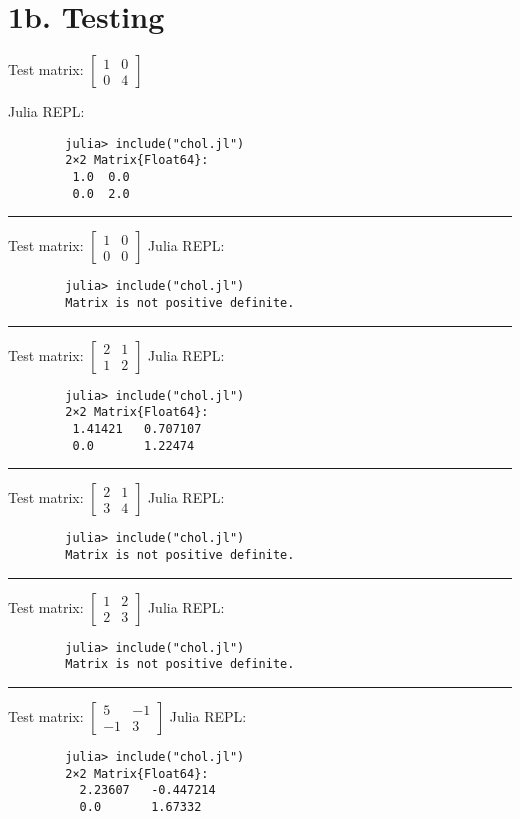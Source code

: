 \documentclass{article}
\begin{document}
    \newpage
    \section*{1b. Testing}
    Test matrix: $\begin{bmatrix}
        1 & 0\\
        0 & 4
    \end{bmatrix}$

    \bigbreak
    \noindent Julia REPL:
    \begin{Verbatim}
        julia> include("chol.jl")
        2×2 Matrix{Float64}:
         1.0  0.0
         0.0  2.0
    \end{Verbatim}

    \hrule\bigbreak
    \noindent Test matrix: $\begin{bmatrix}
        1 & 0\\
        0 & 0
    \end{bmatrix}$
    \bigbreak
    \noindent Julia REPL:

    \begin{Verbatim}
        julia> include("chol.jl")
        Matrix is not positive definite.
    \end{Verbatim}

    \hrule\bigbreak
    \noindent Test matrix: $\begin{bmatrix}
        2 & 1\\
        1 & 2
    \end{bmatrix}$
    \bigbreak
    \noindent Julia REPL:

    \begin{Verbatim}
        julia> include("chol.jl")
        2×2 Matrix{Float64}:
         1.41421   0.707107
         0.0       1.22474
    \end{Verbatim}

    \hrule\bigbreak
    \noindent Test matrix: $\begin{bmatrix}
        2 & 1\\
        3 & 4
    \end{bmatrix}$
    \bigbreak
    \noindent Julia REPL:
    \begin{Verbatim}
        julia> include("chol.jl")
        Matrix is not positive definite.
    \end{Verbatim}
    \hrule\bigbreak
    \noindent Test matrix: $\begin{bmatrix}
        1 & 2\\
        2 & 3
    \end{bmatrix}$
    \bigbreak
    \noindent Julia REPL:
    \begin{Verbatim}
        julia> include("chol.jl")
        Matrix is not positive definite.
    \end{Verbatim}
    \hrule\bigbreak
    \noindent Test matrix: $\begin{bmatrix}
        5 & -1\\
        -1 & 3
    \end{bmatrix}$
    \bigbreak
    \noindent Julia REPL:
    \begin{Verbatim}
        julia> include("chol.jl")
        2×2 Matrix{Float64}:
          2.23607   -0.447214 
          0.0       1.67332
    \end{Verbatim}
    \newpage
\end{document}
